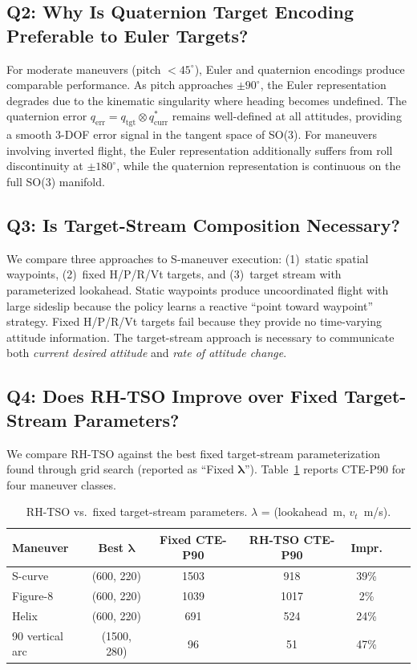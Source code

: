 \documentclass{article}
\begin{document}
\subsection{Q2: Why Is Quaternion Target Encoding Preferable to Euler Targets?}

For moderate maneuvers (pitch $< 45^\circ$), Euler and quaternion encodings produce comparable performance.
As pitch approaches $\pm90^\circ$, the Euler representation degrades due to the kinematic singularity where heading becomes undefined.
The quaternion error $q_{\text{err}} = q_{\text{tgt}} \otimes q_{\text{curr}}^*$ remains well-defined at all attitudes, providing a smooth 3-DOF error signal in the tangent space of SO(3).
For maneuvers involving inverted flight, the Euler representation additionally suffers from roll discontinuity at $\pm180^\circ$, while the quaternion representation is continuous on the full SO(3) manifold.

\subsection{Q3: Is Target-Stream Composition Necessary?}

We compare three approaches to S-maneuver execution: (1)~static spatial waypoints, (2)~fixed H/P/R/Vt targets, and (3)~target stream with parameterized lookahead.
Static waypoints produce uncoordinated flight with large sideslip because the policy learns a reactive ``point toward waypoint'' strategy.
Fixed H/P/R/Vt targets fail because they provide no time-varying attitude information.
The target-stream approach is necessary to communicate both \emph{current desired attitude} and \emph{rate of attitude change}.

\subsection{Q4: Does RH-TSO Improve over Fixed Target-Stream Parameters?}

We compare RH-TSO against the best fixed target-stream parameterization found through grid search (reported as ``Fixed $\bm{\lambda}$'').
Table~\ref{tab:rhtso} reports CTE-P90 for four maneuver classes.

\begin{table}[t]
\caption{RH-TSO vs.\ fixed target-stream parameters. $\lambda$ = (lookahead~m, $v_t$~m/s).}
\label{tab:rhtso}
\centering
\begin{tabular}{lcccccc}
  \hline
  \textbf{Maneuver} & \textbf{Best $\bm{\lambda}$} & \textbf{Fixed CTE-P90} & \textbf{RH-TSO CTE-P90} & \textbf{Impr.} \\
  \hline
  S-curve    & (600, 220)  & 1503 & 918  & 39\% \\
  Figure-8   & (600, 220)  & 1039 & 1017 & 2\%  \\
  Helix      & (600, 220)  & 691  & 524  & 24\% \\
  90\textdegree{} vertical arc & (1500, 280) & 96 & 51 & 47\% \\
  \hline
\end{tabular}
\end{table}
\end{document}
